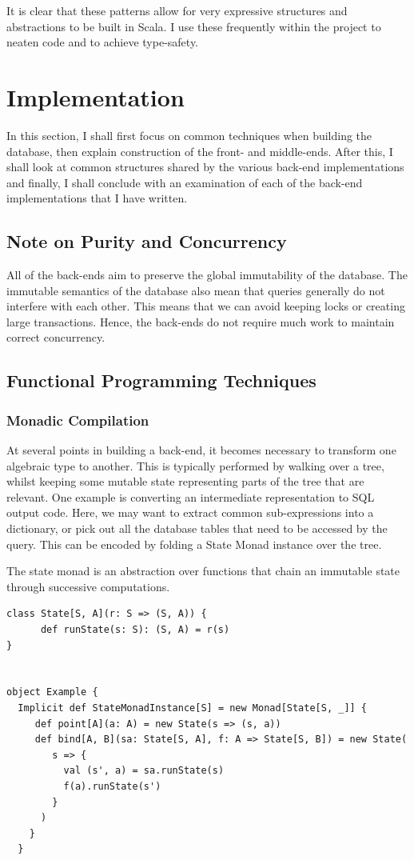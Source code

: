 \documentclass[12pt,a4paper,twoside,openright]{report}
\renewcommand{\baselinestretch}{1.1}    %
\begin{document}
It is clear that these patterns allow for very expressive structures and abstractions to be built in Scala. I use these frequently within the project to neaten code and to achieve type-safety.



\chapter{Implementation}

In this section, I shall first focus on common techniques when building the database, then explain construction of the front- and middle-ends. After this, I shall look at common structures shared by the various back-end implementations and finally, I shall conclude with an examination of each of the back-end implementations that I have written. 
\section{Note on Purity and Concurrency}
All of the back-ends aim to preserve the global immutability of the database. The immutable semantics of the database also mean that queries generally do not interfere with each other. This means that we can avoid keeping locks or creating large transactions. Hence, the back-ends do not require much work to maintain correct concurrency.
\section{Functional Programming Techniques}
	\subsection{Monadic Compilation}\label{MonadicCompilation}
	At several points in building a back-end, it becomes necessary to transform one algebraic type to another. This is typically performed by walking over a tree, whilst keeping some mutable state representing parts of the tree that are relevant. One example is converting an intermediate representation to SQL output code. Here, we may want to extract common sub-expressions into a dictionary, or pick out all the database tables that need to be accessed by the query. This can be encoded by folding a State Monad instance over the tree.

The state monad is an abstraction over functions that chain an immutable state through successive computations.

\renewcommand{\baselinestretch}{0.8}
\begin{framed}
\begin{verbatim}
class State[S, A](r: S => (S, A)) {
      def runState(s: S): (S, A) = r(s)
}


object Example {
  Implicit def StateMonadInstance[S] = new Monad[State[S, _]] {
     def point[A](a: A) = new State(s => (s, a))
     def bind[A, B](sa: State[S, A], f: A => State[S, B]) = new State(
        s => {
          val (s', a) = sa.runState(s)
          f(a).runState(s')
        }           
      )
    }
  }
\end{verbatim}
\end{framed}
\renewcommand{\baselinestretch}{1.1}
\end{document}

